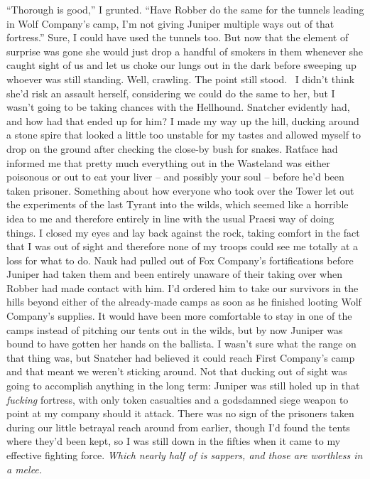 \documentclass[12pt, openany]{book}
\begin{document}
“Thorough is good,” I grunted. “Have Robber do the same for the tunnels leading in Wolf Company’s camp, I’m not giving Juniper multiple ways out of that fortress.”
Sure, I could have used the tunnels too. But now that the element of surprise was gone she would just drop a handful of smokers in them whenever she caught sight of us and let us choke our lungs out in the dark before sweeping up whoever was still standing. Well, crawling. The point still stood.  I didn’t think she’d risk an assault herself, considering we could do the same to her, but I wasn’t going to be taking chances with the Hellhound. Snatcher evidently had, and how had that ended up for him? I made my way up the hill, ducking around a stone spire that looked a little too unstable for my tastes and allowed myself to drop on the ground after checking the close-by bush for snakes.
Ratface had informed me that pretty much everything out in the Wasteland was either poisonous or out to eat your liver – and possibly your soul – before he’d been taken prisoner. Something about how everyone who took over the Tower let out the experiments of the last Tyrant into the wilds, which seemed like a horrible idea to me and therefore entirely in line with the usual Praesi way of doing things. I closed my eyes and lay back against the rock, taking comfort in the fact that I was out of sight and therefore none of my troops could see me totally at a loss for what to do. Nauk had pulled out of Fox Company’s fortifications before Juniper had taken them and been entirely unaware of their taking over when Robber had made contact with him. I’d ordered him to take our survivors in the hills beyond either of the already-made camps as soon as he finished looting Wolf Company’s supplies.
It would have been more comfortable to stay in one of the camps instead of pitching our tents out in the wilds, but by now Juniper was bound to have gotten her hands on the ballista. I wasn’t sure what the range on that thing was, but Snatcher had believed it could reach First Company’s camp and that meant we weren’t sticking around. Not that ducking out of sight was going to accomplish anything in the long term: Juniper was still holed up in that \textit{fucking} fortress, with only token casualties and a godsdamned siege weapon to point at my company should it attack. There was no sign of the prisoners taken during our little betrayal reach around from earlier, though I’d found the tents where they’d been kept, so I was still down in the fifties when it came to my effective fighting force. \textit{Which nearly half of is sappers, and those are worthless in a melee.}
\end{document}

